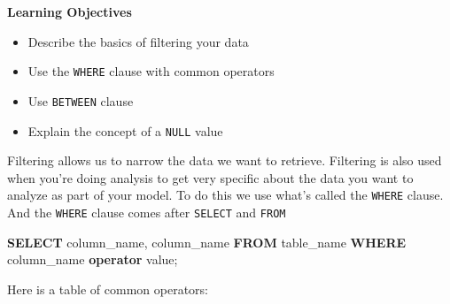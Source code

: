 \documentclass[]{book}
\newenvironment{Shaded}{\begin{snugshade}}{\end{snugshade}}
\newcommand{\KeywordTok}[1]{\textcolor[rgb]{0.13,0.29,0.53}{\textbf{{#1}}}}
\newcommand{\FunctionTok}[1]{\textcolor[rgb]{0.00,0.00,0.00}{{#1}}}
\newcommand{\NormalTok}[1]{{#1}}
\providecommand{\tightlist}{%
  \setlength{\itemsep}{0pt}\setlength{\parskip}{0pt}}
\theoremstyle{definition}
\theoremstyle{definition}
\theoremstyle{remark}
\begin{document}
\textbf{Learning Objectives}

\begin{itemize}
\tightlist
\item
  Describe the basics of filtering your data
\item
  Use the \texttt{WHERE} clause with common operators
\item
  Use \texttt{BETWEEN} clause
\item
  Explain the concept of a \texttt{NULL} value
\end{itemize}

Filtering allows us to narrow the data we want to retrieve. Filtering is
also used when you're doing analysis to get very specific about the data
you want to analyze as part of your model. To do this we use what's
called the \texttt{WHERE} clause. And the \texttt{WHERE} clause comes
after \texttt{SELECT} and \texttt{FROM}

\begin{Shaded}
\begin{Highlighting}[]
\KeywordTok{SELECT} \NormalTok{column_name, column_name}
\KeywordTok{FROM} \NormalTok{table_name}
\KeywordTok{WHERE} \NormalTok{column_name }\KeywordTok{operator} \FunctionTok{value}\NormalTok{;}
\end{Highlighting}
\end{Shaded}

Here is a table of common operators:
\end{document}
